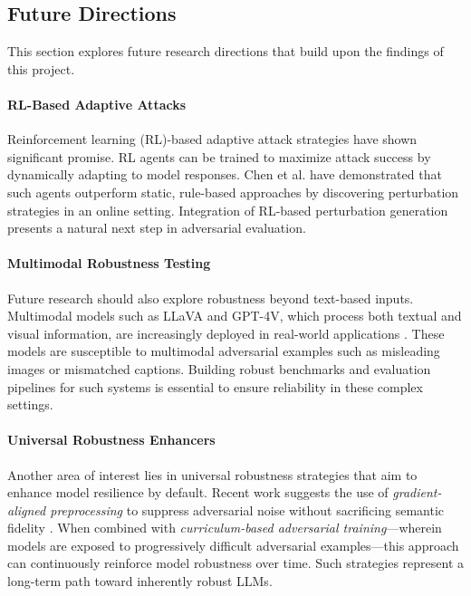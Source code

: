 \documentclass[conference]{IEEEtran}
\begin{document}
\subsection{Future Directions}

This section explores future research directions that build upon the findings of this project.

\paragraph{RL-Based Adaptive Attacks}
Reinforcement learning (RL)-based adaptive attack strategies have shown significant promise. RL agents can be trained to maximize attack success by dynamically adapting to model responses. Chen et al. \cite{chen2025worstcase} have demonstrated that such agents outperform static, rule-based approaches by discovering perturbation strategies in an online setting. Integration of RL-based perturbation generation presents a natural next step in adversarial evaluation.

\paragraph{Multimodal Robustness Testing}
Future research should also explore robustness beyond text-based inputs. Multimodal models such as LLaVA and GPT-4V, which process both textual and visual information, are increasingly deployed in real-world applications \cite{wsj2025securityrisks}. These models are susceptible to multimodal adversarial examples such as misleading images or mismatched captions. Building robust benchmarks and evaluation pipelines for such systems is essential to ensure reliability in these complex settings\cite{wsj2025securityrisks}.

\paragraph{Universal Robustness Enhancers}
Another area of interest lies in universal robustness strategies that aim to enhance model resilience by default. Recent work suggests the use of \textit{gradient-aligned preprocessing} to suppress adversarial noise without sacrificing semantic fidelity \cite{omar2022robust}. When combined with \textit{curriculum-based adversarial training}—wherein models are exposed to progressively difficult adversarial examples—this approach can continuously reinforce model robustness over time. Such strategies represent a long-term path toward inherently robust LLMs.
\end{document}
